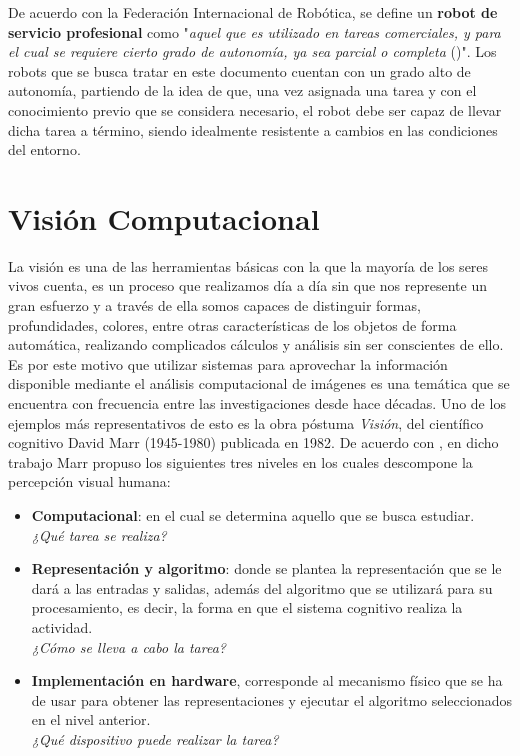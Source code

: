 De acuerdo con la Federación Internacional de Robótica, se define un \textbf{robot de servicio profesional} como "\textit{aquel que es utilizado en tareas comerciales, y para el cual se requiere cierto grado de autonomía, ya sea parcial o completa} (\cite*{ifr_international})". Los robots que se busca tratar en este documento cuentan con un grado alto de autonomía, partiendo de la idea de que, una vez asignada una tarea y con el conocimiento previo que se considera necesario, el robot debe ser capaz de llevar dicha tarea a término, siendo idealmente resistente a cambios en las condiciones del entorno.
  
\section{Visión Computacional}
La visión es una de las herramientas básicas con la que la mayoría de los seres vivos cuenta, es un proceso que realizamos día a día sin que nos represente un gran esfuerzo y a través de ella somos capaces de distinguir formas, profundidades, colores, entre otras características de los objetos de forma automática, realizando complicados cálculos y análisis sin ser conscientes de ello. Es por este motivo que utilizar sistemas para aprovechar la información disponible mediante el análisis computacional de imágenes es una temática que se encuentra con frecuencia entre las investigaciones desde hace décadas. Uno de los ejemplos más representativos de esto es la obra póstuma \textit{Visión}, del científico cognitivo David Marr (1945-1980) publicada en 1982. De acuerdo con \cite{freire_importancia_2007}, en dicho trabajo Marr propuso los siguientes tres niveles en los cuales descompone la percepción visual humana:

\begin{itemize} 
    \item \textbf{Computacional}: en el cual se determina aquello que se busca estudiar.\\
    \textit{¿Qué tarea se realiza?}
    \item \textbf{Representación y algoritmo}: donde se plantea la representación que se le dará a las entradas y salidas, además del algoritmo que se utilizará para su procesamiento, es decir, la forma en que el sistema cognitivo realiza la actividad. \\
    \textit{¿Cómo se lleva a cabo la tarea?}
    \item \textbf{Implementación en hardware}, corresponde al mecanismo físico que se ha de usar para obtener las representaciones y ejecutar el algoritmo seleccionados en el nivel anterior. \\
    \textit{¿Qué dispositivo puede realizar la tarea?} \cite*{freire_importancia_2007}
\end{itemize}


